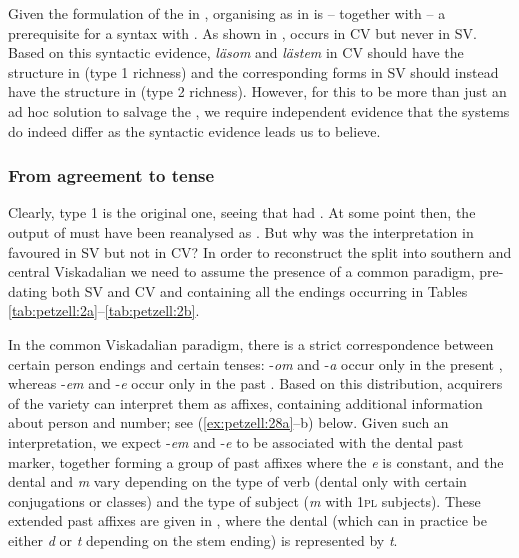 \documentclass[output=paper,colorlinks,citecolor=brown,draft,draftmode]{langscibook}
\begin{document}
Given the formulation of the  in , organising  as in  is – together with  – a prerequisite for a syntax with . As shown in ,  occurs in CV but never in SV. Based on this syntactic evidence, \textit{läsom} and \textit{lästem} in CV should have the structure in  (type 1 richness) and the corresponding forms in SV should instead have the structure in  (type 2 richness). However, for this to be more than just an ad hoc solution to salvage the , we require independent evidence that the  systems do indeed differ as the syntactic evidence leads us to believe.


\subsubsection{From agreement to tense}\label{sec:petzell:4.3.2}\largerpage


Clearly, type 1  is the original one, seeing that  had . At some point then, the output of  must have been reanalysed as . But why was the interpretation in  favoured in SV but not in CV? In order to reconstruct the split into southern and central Viskadalian we need to assume the presence of a common paradigm, pre-dating both SV and CV and containing all the endings occurring in Tables \ref{tab:petzell:2a}–\ref{tab:petzell:2b}.



In the common Viskadalian paradigm, there is a strict correspondence between certain person endings and certain tenses: -\textit{om} and -\textit{a} occur only in the present , whereas -\textit{em} and -\textit{e} occur only in the past . Based on this distribution, acquirers of the variety can interpret them as  affixes, containing additional information about person and number; see (\ref{ex:petzell:28a}–b) below. Given such an interpretation, we expect -\textit{em} and -\textit{e} to be associated with the dental past  marker, together forming a group of past  affixes where the \textit{e} is constant, and the dental and \textit{m} vary depending on the type of verb (dental only with certain conjugations or classes) and the type of subject (\textit{m} with 1\textsc{pl} subjects). These extended past  affixes are given in , where the dental (which can in practice be either \textit{d} or \textit{t} depending on the stem ending) is represented by \textit{t}.
\end{document}
